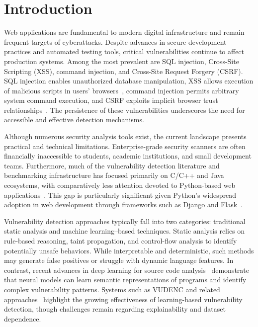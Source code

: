 \chapter{Introduction}
\label{ch:introduction}

%

Web applications are fundamental to modern digital infrastructure and remain frequent targets of cyberattacks. Despite advances in secure development practices and automated testing tools, critical vulnerabilities continue to affect production systems. Among the most prevalent are SQL injection, Cross-Site Scripting (XSS), command injection, and Cross-Site Request Forgery (CSRF). SQL injection enables unauthorized database manipulation, XSS allows execution of malicious scripts in users' browsers~\cite{OWASPXSSCheatsheet,CWE79}, command injection permits arbitrary system command execution, and CSRF exploits implicit browser trust relationships~\cite{OWASPTop10,OWASPSQLiCheatsheet,OWASPCSRCheatsheet,OWASPCommandInjection,CWE89,CWE352,CWE78}. The persistence of these vulnerabilities underscores the need for accessible and effective detection mechanisms.

Although numerous security analysis tools exist, the current landscape presents practical and technical limitations. Enterprise-grade security scanners are often financially inaccessible to students, academic institutions, and small development teams. Furthermore, much of the vulnerability detection literature and benchmarking infrastructure has focused primarily on C/C++ and Java ecosystems, with comparatively less attention devoted to Python-based web applications~\cite{Allamanis2018Survey,Li2018VulDeePecker,Fan2020BigVul,Fan2023DiverseVul,Zhou2019Devign,Zhang2025DLSurvey}. This gap is particularly significant given Python's widespread adoption in web development through frameworks such as Django and Flask~\cite{Flask,Django}.

Vulnerability detection approaches typically fall into two categories: traditional static analysis and machine learning--based techniques. Static analysis relies on rule-based reasoning, taint propagation, and control-flow analysis to identify potentially unsafe behaviors. While interpretable and deterministic, such methods may generate false positives or struggle with dynamic language features. In contrast, recent advances in deep learning for source code analysis~\cite{Allamanis2018Survey,Alon2019code2vec,Feng2020CodeBERT,Zhou2019Devign,Steenhoek2024DeepDFA,SySeVR2021} demonstrate that neural models can learn semantic representations of programs and identify complex vulnerability patterns. Systems such as VUDENC and related approaches~\cite{VulnDetection,GitHubVulnerabilityDetectionRepo,PythonVulnDetectionDataset,Li2018VulDeePecker,Fan2020BigVul,Fan2023DiverseVul,Zhang2025DLSurvey,NISTNVD} highlight the growing effectiveness of learning-based vulnerability detection, though challenges remain regarding explainability and dataset dependence.

